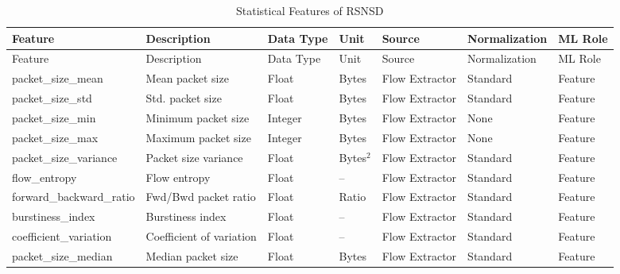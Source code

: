 \documentclass[12pt,a4paper]{article}
\begin{document}
\begin{longtable}{p{3cm}p{5cm}p{2cm}p{1.5cm}p{2.3cm}p{2cm}p{2cm}}
	\caption{Statistical Features of RSNSD}
	\label{tab:statistical_features}\\
	
	\toprule
	Feature & Description & Data Type & Unit & Source & Normalization & ML Role\\
	\midrule
	\endfirsthead
	
	\toprule
	Feature & Description & Data Type & Unit & Source & Normalization & ML Role\\
	\midrule
	\endhead
	
	packet\_size\_mean & Mean packet size & Float & Bytes & Flow Extractor & Standard & Feature\\
	packet\_size\_std & Std. packet size & Float & Bytes & Flow Extractor & Standard & Feature\\
	packet\_size\_min & Minimum packet size & Integer & Bytes & Flow Extractor & None & Feature\\
	packet\_size\_max & Maximum packet size & Integer & Bytes & Flow Extractor & None & Feature\\
	packet\_size\_variance & Packet size variance & Float & Bytes$^2$ & Flow Extractor & Standard & Feature\\
	flow\_entropy & Flow entropy & Float & -- & Flow Extractor & Standard & Feature\\
	forward\_backward\_ratio & Fwd/Bwd packet ratio & Float & Ratio & Flow Extractor & Standard & Feature\\
	burstiness\_index & Burstiness index & Float & -- & Flow Extractor & Standard & Feature\\
	coefficient\_variation & Coefficient of variation & Float & -- & Flow Extractor & Standard & Feature\\
	packet\_size\_median & Median packet size & Float & Bytes & Flow Extractor & Standard & Feature\\
	
	\bottomrule
\end{longtable}
\end{document}
